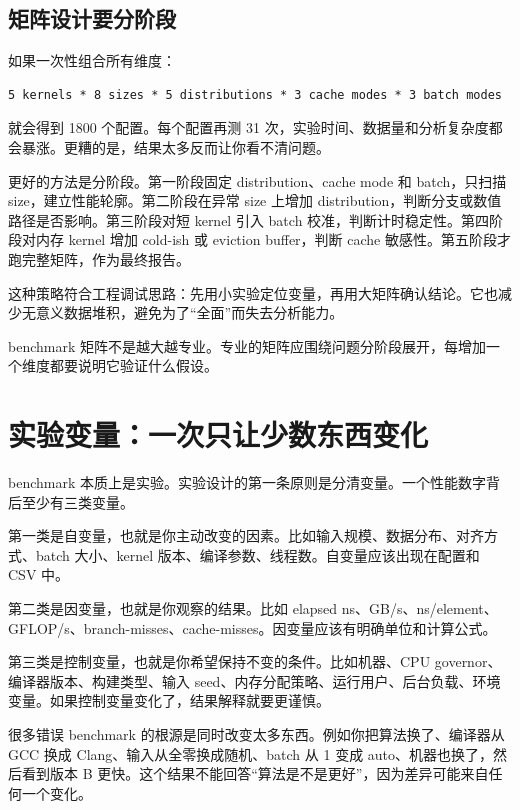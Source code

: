 \subsection{矩阵设计要分阶段}

如果一次性组合所有维度：

\begin{lstlisting}
5 kernels * 8 sizes * 5 distributions * 3 cache modes * 3 batch modes
\end{lstlisting}

就会得到 1800 个配置。每个配置再测 31 次，实验时间、数据量和分析复杂度都会暴涨。更糟的是，结果太多反而让你看不清问题。

更好的方法是分阶段。第一阶段固定 distribution、cache mode 和 batch，只扫描 size，建立性能轮廓。第二阶段在异常 size 上增加 distribution，判断分支或数值路径是否影响。第三阶段对短 kernel 引入 batch 校准，判断计时稳定性。第四阶段对内存 kernel 增加 cold-ish 或 eviction buffer，判断 cache 敏感性。第五阶段才跑完整矩阵，作为最终报告。

这种策略符合工程调试思路：先用小实验定位变量，再用大矩阵确认结论。它也减少无意义数据堆积，避免为了“全面”而失去分析能力。

\begin{keyidea}
benchmark 矩阵不是越大越专业。专业的矩阵应围绕问题分阶段展开，每增加一个维度都要说明它验证什么假设。
\end{keyidea}

\section{实验变量：一次只让少数东西变化}

benchmark 本质上是实验。实验设计的第一条原则是分清变量。一个性能数字背后至少有三类变量。

第一类是自变量，也就是你主动改变的因素。比如输入规模、数据分布、对齐方式、batch 大小、kernel 版本、编译参数、线程数。自变量应该出现在配置和 CSV 中。

第二类是因变量，也就是你观察的结果。比如 elapsed ns、GB/s、ns/element、GFLOP/s、branch-misses、cache-misses。因变量应该有明确单位和计算公式。

第三类是控制变量，也就是你希望保持不变的条件。比如机器、CPU governor、编译器版本、构建类型、输入 seed、内存分配策略、运行用户、后台负载、环境变量。如果控制变量变化了，结果解释就要更谨慎。

很多错误 benchmark 的根源是同时改变太多东西。例如你把算法换了、编译器从 GCC 换成 Clang、输入从全零换成随机、batch 从 1 变成 auto、机器也换了，然后看到版本 B 更快。这个结果不能回答“算法是不是更好”，因为差异可能来自任何一个变化。

